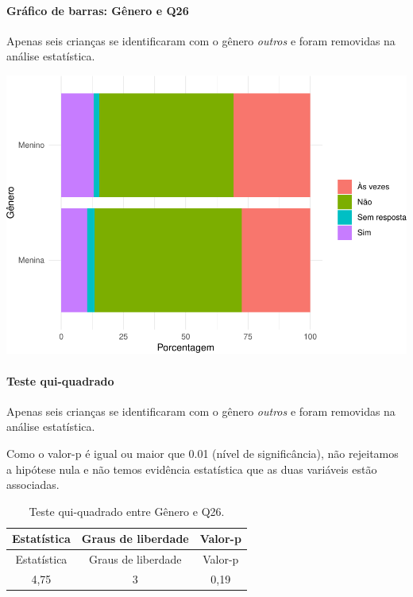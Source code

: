\documentclass[]{article}
\let\oldparagraph\paragraph
\renewcommand{\paragraph}[1]{\oldparagraph{#1}\mbox{}}
\begin{document}
\hypertarget{gruxe1fico-de-barras-guxeanero-e-q26}{%
\paragraph{Gráfico de barras: Gênero e Q26}\label{gruxe1fico-de-barras-guxeanero-e-q26}}

Apenas seis crianças se identificaram com o gênero \emph{outros} e foram removidas na análise estatística.

\begin{center}\includegraphics[width=0.75\linewidth]{relatorio_covid19_files/figure-latex/unnamed-chunk-731-1} \end{center}

\hypertarget{teste-qui-quadrado-63}{%
\paragraph{Teste qui-quadrado}\label{teste-qui-quadrado-63}}

Apenas seis crianças se identificaram com o gênero \emph{outros} e foram removidas na análise estatística.

Como o valor-p é igual ou maior que 0.01 (nível de significância), não rejeitamos a hipótese nula e não temos evidência estatística que as duas variáveis estão associadas.

\begin{longtable}[]{@{}ccc@{}}
\caption{\label{tab:unnamed-chunk-733}Teste qui-quadrado entre Gênero e Q26.}\tabularnewline
\toprule
Estatística & Graus de liberdade & Valor-p\tabularnewline
\midrule
\endfirsthead
\toprule
Estatística & Graus de liberdade & Valor-p\tabularnewline
\midrule
\endhead
4,75 & 3 & 0,19\tabularnewline
\bottomrule
\end{longtable}

\cleardoublepage
\end{document}
